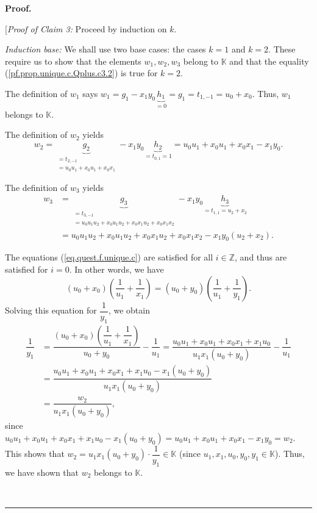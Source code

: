 \documentclass[numbers=enddot,12pt,final,onecolumn,notitlepage]{scrartcl}%
\theoremstyle{definition}
\newenvironment{statement}{\begin{quote}}{\end{quote}}
\newenvironment{proof}[1][Proof]{\noindent\textbf{#1.} }{\ \rule{0.5em}{0.5em}}
\newenvironment{verlong}{}{}
\begin{document}
\begin{verlong}
\begin{proof}
\begin{statement}
\end{statement}

[\textit{Proof of Claim 3:} Proceed by induction on $k$.

\textit{Induction base:} We shall use two base cases: the cases $k=1$ and
$k=2$. These require us to show that the elements $w_{1},w_{2},w_{3}$ belong
to $\mathbb{K}$ and that the equality (\ref{pf.prop.unique.c.Qplus.c3.2}) is
true for $k=2$.

The definition of $w_{1}$ says $w_{1}=g_{1}-x_{1}y_{0}\underbrace{h_{1}}%
_{=0}=g_{1}=t_{1,-1}=u_{0}+x_{0}$. Thus, $w_{1}$ belongs to $\mathbb{K}$.

The definition of $w_{2}$ yields%
\[
w_{2}=\underbrace{g_{2}}_{\substack{=t_{2,-1}\\=u_{0}u_{1}+x_{0}u_{1}%
+x_{0}x_{1}}}-x_{1}y_{0}\underbrace{h_{2}}_{=t_{0,1}=1}=u_{0}u_{1}+x_{0}%
u_{1}+x_{0}x_{1}-x_{1}y_{0}.
\]


The definition of $w_{3}$ yields%
\begin{align*}
w_{3}  &  =\underbrace{g_{3}}_{\substack{=t_{3,-1}\\=u_{0}u_{1}u_{2}%
+x_{0}u_{1}u_{2}+x_{0}x_{1}u_{2}+x_{0}x_{1}x_{2}}}-x_{1}y_{0}\underbrace{h_{3}%
}_{=t_{1,1}=u_{2}+x_{2}}\\
&  =u_{0}u_{1}u_{2}+x_{0}u_{1}u_{2}+x_{0}x_{1}u_{2}+x_{0}x_{1}x_{2}-x_{1}%
y_{0}\left(  u_{2}+x_{2}\right)  .
\end{align*}


The equations (\ref{eq.quest.f.unique.c}) are satisfied for all $i\in
\mathbb{Z}$, and thus are satisfied for $i=0$. In other words, we have%
\[
\left(  u_{0}+x_{0}\right)  \left(  \dfrac{1}{u_{1}}+\dfrac{1}{x_{1}}\right)
=\left(  u_{0}+y_{0}\right)  \left(  \dfrac{1}{u_{1}}+\dfrac{1}{y_{1}}\right)
.
\]
Solving this equation for $\dfrac{1}{y_{1}}$, we obtain%
\begin{align}
\dfrac{1}{y_{1}}  &  =\dfrac{\left(  u_{0}+x_{0}\right)  \left(  \dfrac
{1}{u_{1}}+\dfrac{1}{x_{1}}\right)  }{u_{0}+y_{0}}-\dfrac{1}{u_{1}}%
=\dfrac{u_{0}u_{1}+x_{0}u_{1}+x_{0}x_{1}+x_{1}u_{0}}{u_{1}x_{1}\left(
u_{0}+y_{0}\right)  }-\dfrac{1}{u_{1}}\nonumber\\
&  =\dfrac{u_{0}u_{1}+x_{0}u_{1}+x_{0}x_{1}+x_{1}u_{0}-x_{1}\left(
u_{0}+y_{0}\right)  }{u_{1}x_{1}\left(  u_{0}+y_{0}\right)  }\nonumber\\
&  =\dfrac{w_{2}}{u_{1}x_{1}\left(  u_{0}+y_{0}\right)  },
\label{pf.prop.unique.c.Qplus.c3.pf.1}%
\end{align}
since $u_{0}u_{1}+x_{0}u_{1}+x_{0}x_{1}+x_{1}u_{0}-x_{1}\left(  u_{0}%
+y_{0}\right)  =u_{0}u_{1}+x_{0}u_{1}+x_{0}x_{1}-x_{1}y_{0}=w_{2}$. This shows
that $w_{2}=u_{1}x_{1}\left(  u_{0}+y_{0}\right)  \cdot\dfrac{1}{y_{1}}%
\in\mathbb{K}$ (since $u_{1},x_{1},u_{0},y_{0},y_{1}\in\mathbb{K}$). Thus, we
have shown that $w_{2}$ belongs to $\mathbb{K}$.


\end{proof}
\end{verlong}
\end{document}
